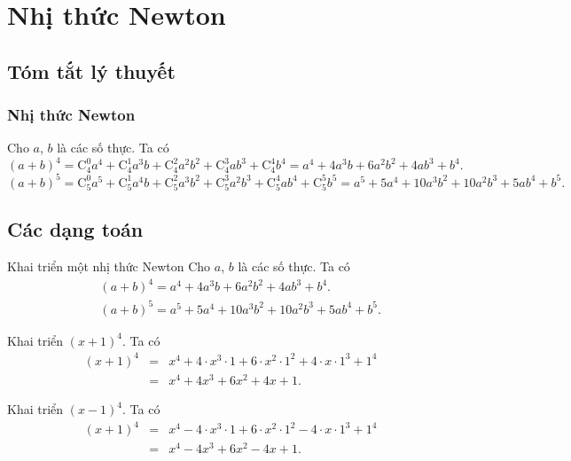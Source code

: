 ﻿\newpage\setcounter{dang}{0}
\section{Nhị thức Newton}
\subsection{Tóm tắt lý thuyết}
\subsubsection{Nhị thức Newton}
Cho $a$, $b$ là các số thực. Ta có 
$$(a+b)^4=\mathrm{C}_4^0a^4+\mathrm{C}_4^1a^{3}b+\mathrm{C}_4^2a^{2}b^2 +\mathrm{C}_4^{3}ab^{3}+\mathrm{C}_4^4b^4 = a^4+4a^3b+6a^2b^2+4ab^3+b^4.$$
$$(a+b)^5=\mathrm{C}_5^0a^5+\mathrm{C}_5^1a^{4}b+\mathrm{C}_5^2a^{3}b^2 +\mathrm{C}_5^{3}a^2b^{3}+\mathrm{C}_5^4ab^4+\mathrm{C}_5^5b^5 = a^5+5a^4+10a^3b^2+10a^2b^3+5ab^4+b^5.$$
	\subsection{Các dạng toán}	
\begin{dang}{Khai triển một nhị thức Newton}
	Cho $a$, $b$ là các số thực. Ta có 
	\begin{eqnarray*}
		&&(a+b)^4=a^4+4a^3b+6a^2b^2+4ab^3+b^4.\\&&(a+b)^5=a^5+5a^4+10a^3b^2+10a^2b^3+5ab^4+b^5.
	\end{eqnarray*}
\end{dang}
\viduminhhoa
\begin{vd}%
	Khai triển $(x+1)^4$.
	\loigiai
	{
		Ta có
		\begin{eqnarray*}
			(x+1)^4&=&x^4+4\cdot x^{3}\cdot 1+6\cdot x^{2}\cdot 1^2+4\cdot x\cdot 1^3+ 1^4\\&=&x^4+4x^3+6x^2+4x+1.
		\end{eqnarray*}
	}
\end{vd}

\begin{vd}%
	Khai triển $(x-1)^4$.
	\loigiai
	{
		Ta có
		\begin{eqnarray*}
			(x+1)^4&=&x^4-4\cdot x^{3}\cdot 1+6\cdot x^{2}\cdot 1^2-4\cdot x\cdot 1^3+ 1^4\\&=&x^4-4x^3+6x^2-4x+1.
		\end{eqnarray*}
	}
\end{vd}

